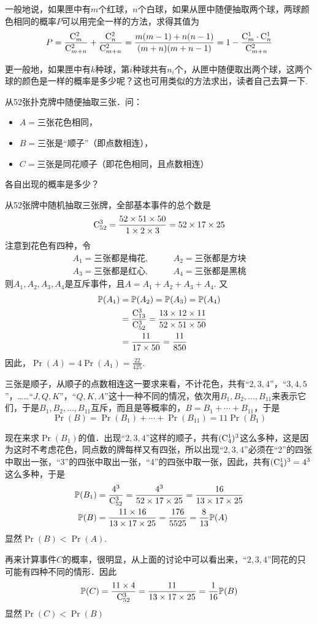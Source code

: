 一般地说，如果匣中有$m$个红球，$n$个白球，如果从匣中随便抽取两个球，两球颜色相同的概率$P$可以用完全一样的方法，求得其值为
\[P=\dfrac{{\rm C}^{2}_{m}}{{\rm C}^{2}_{m+n}}+\dfrac{{\rm C}^{2}_{n}}{{\rm C}^{2}_{m+n}}=\dfrac{m(m-1)+n(n-1)}{(m+n)(m+n-1)}=1-\dfrac{{\rm C}^{1}_{m}\cdot {\rm C}^{1}_{n}}{{\rm C}^{2}_{m+n}}\]

更一般地，如果匣中有$k$种球，第$i$种球共有$n_i$个，从匣中随便取出两个球，这两个球的颜色是一样的概率是多少呢？这也可用类似的方法求出，读者自己去算一下.

\begin{example}
    从52张扑克牌中随便抽取三张．问：
\begin{itemize}
\item $A=$三张花色相同，
\item $B=$三张是“顺子”（即点数相连），
\item $C=$三张是同花顺子（即花色相同，且点数相连）
\end{itemize}
各自出现的概率是多少？
\end{example}

\begin{solution}
从52张牌中随机抽取三张牌，全部基本事件的总个数是
\[{\rm C}^{3}_{52}=\dfrac{52\times 51\times 50}{1\times 2\times 3}=52\times 17\times 25\]
注意到花色有四种，令
\[\begin{split}
    A_1=\text{三张都是梅花},&\qquad 
A_2=\text{三张都是方块}\\
A_3=\text{三张都是红心},&\qquad 
A_4=\text{三张都是黑桃}
\end{split}\]
则$A_1,A_2,A_3,A_4$是互斥事件，且$A=A_1+A_2+A_3+A_4$. 又
\[\begin{split}
    \mathbb{P}(A_1)&=\mathbb{P}(A_2)=\mathbb{P}(A_3)=\mathbb{P}(A_4)\\
    &=\dfrac{{\rm C}^{3}_{13}}{{\rm C}^{3}_{52}}=\dfrac{13\times 12\times 11}{52\times 51\times 50}\\
    &=\dfrac{11}{17\times 50}=\dfrac{11}{850}
\end{split} \]
因此，$\Pr(A)=4\Pr(A_1)=\frac{22}{425}$.

三张是顺子，从顺子的点数相连这一要求来看，不计花色，共有“$2,3,4$”，“$3,4,5$”，……“$J,Q,K$”，“$Q,K,A$”这十一种不同的情况，依次用$B_1,B_2,\ldots,B_{11}$来表示它们，于是$B_1,B_2,\ldots,B_{11}$互斥，而且是等概率的，$B=B_1+\cdots+B_{11}$，于是
\[\Pr(B)=\Pr(B_1)+\cdots +\Pr(B_{11})=11\Pr(B_1)\]

现在来求$\Pr(B_1)$的值．出现“$2,3,4$”这样的顺子，共有$({\rm C}^{1}_{4})^3$这么多种，这是因为这时不考虑花色，同点数的牌每样又有四张，所以出现“$2,3,4$”必须在“2”的四张中取出一张，“3”的四张中取出一张，“4”的四张中取一张，因此，共有$({\rm C}^{1}_{4})^3=4^3$这么多种，于是
\[\begin{split}
    \mathbb{P}(B_1)&=\dfrac{4^3}{{\rm C}^{3}_{52}}=\dfrac{4^3}{52\times 17\times 25}=\dfrac{16}{13\times 17\times 25}\\
    \mathbb{P}(B)&=\dfrac{11\times 16}{13\times 17\times 25}=\dfrac{176}{5525}=\dfrac{8}{13}\mathbb{P}(A)
\end{split}\]
显然$\Pr(B)<\Pr(A)$.

再来计算事件$C$的概率，很明显，从上面的讨论中可以看出来，“$2,3,4$”同花的只可能有四种不同的情形．因此
\[\mathbb{P}(C)=\dfrac{11\times 4}{{\rm C}^{3}_{52}}=\dfrac{11}{13\times17\times25} =\dfrac{1}{16}\mathbb{P}(B)\]
显然$\Pr(C)<\Pr(B)$

\end{solution}

